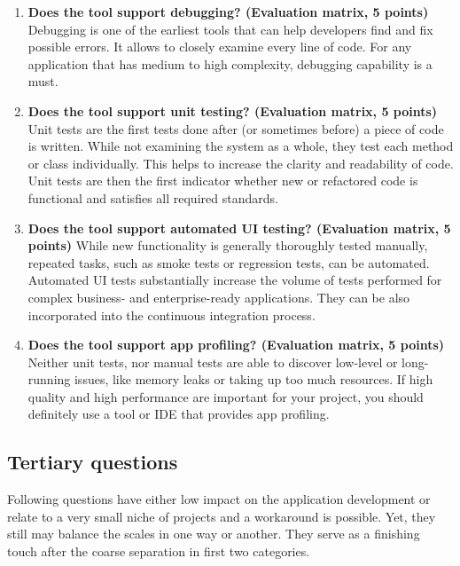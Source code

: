 \documentclass[english,master,public,dept460,male,cpdeclaration,oneside]{diploma}
\begin{document}
\begin{enumerate}
	\item \textbf{Does the tool support debugging? (Evaluation matrix, 5 points) }
	Debugging is one of the earliest tools that can help developers find and fix possible errors. It allows to closely examine every line of code. For any application that has medium to high complexity, debugging capability is a must.
	
	\item \textbf{Does the tool support unit testing? (Evaluation matrix, 5 points) }
	Unit tests are the first tests done after (or sometimes before) a piece of code is written. While not examining the system as a whole, they test each method or class individually. This helps to increase the clarity and readability of code. Unit tests are then the first indicator whether new or refactored code is functional and satisfies all required standards.
	
	\item \textbf{Does the tool support automated UI testing? (Evaluation matrix, 5 points) }
	While new functionality is generally thoroughly tested manually, repeated tasks, such as smoke tests or regression tests, can be automated. Automated UI tests substantially increase the volume of tests performed for complex business- and enterprise-ready applications. They can be also incorporated into the continuous integration process.
	
	\item \textbf{Does the tool support app profiling? (Evaluation matrix, 5 points) }
	Neither unit tests, nor manual tests are able to discover low-level or long-running issues, like memory leaks or taking up too much resources. If high quality and high performance are important for your project, you should definitely use a tool or IDE that provides app profiling.
\end{enumerate}

\subsection{Tertiary questions}
Following questions have either low impact on the application development or relate to a very small niche of projects and a workaround is possible. Yet, they still may balance the scales in one way or another. They serve as a finishing touch after the coarse separation in first two categories.
\end{document}
